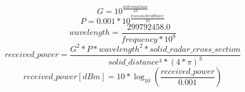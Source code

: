 \documentclass{article}
\begin{document}
$$ G = 10^{\frac{antennaGain}{10}} $$
$$ P = 0.001 * 10^{\frac{transmittedPower}{10}} $$
$$ wavelength = \frac{299792458.0}{frequency * 10^{9}} $$
$$ received\_power = \frac{G^{2} * P * wavelength^{2} * solid\_radar\_cross\_section}{solid\_distance^{4} * (4 * \pi)^{3} } $$
$$ received\_power [dBm] = 10 * \log_{10}(\frac{received\_power}{0.001}) $$
\end{document}
